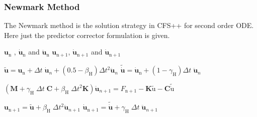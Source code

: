 \subsubsection{Newmark Method}
The Newmark method is the solution strategy in CFS++ for second order ODE. Here just the predictor
corrector formulation is given.
\begin{algorithm}
\caption{General Newmark Effective Mass Formulation} \label{alg:NewmarkEFFMASS}
\begin{algorithmic}
\REQUIRE $\mathbf{u}_{\mathrm{n}}$ , $\mathbf{\dot{u}}_{\mathrm{n}}$ and $\mathbf{\ddot{u}}_{\mathrm{n}}$
\ENSURE $\mathbf{u}_{\mathrm{n}+1}$, $\mathbf{\dot{u}}_{\mathrm{n}+1}$ and $\mathbf{\dot{u}}_{\mathrm{n}+1}$

\STATE {}
\STATE $\tilde{\mathbf{u}} = \mathbf{u}_{\mathrm{n}} + \Delta t\;\mathbf{\dot{u}}_{n}+ (0.5-\beta_{\mathrm{H}}) \Delta
t^2 \mathbf{\ddot{u}}_{n}$
\STATE $\mathbf{\tilde{\dot{u}}} = \mathbf{\dot{u}}_{\mathrm{n}} + (1-\gamma_\mathrm{H}) \Delta t \; \mathbf{\ddot{u}}_{n}$

\STATE {}
\STATE $\left( \mathbf{M} + \gamma_{\mathrm{H}}\; \Delta t\; \mathbf{C} + \beta_{\mathrm{H}}\; \Delta t^2 \mathbf{K}
\right) \mathbf{\ddot{u}}_{n+1} = F_{\mathrm{n}+1} - \mathbf{K} \tilde{\mathrm{u}} - \mathbf{C} \mathrm{\tilde{\dot{u}}}$ 

\STATE {}
\STATE $\mathbf{u}_{\mathrm{n}+1} = \tilde{\mathbf{u}} + \beta_{\mathrm{H}}\; \Delta t^2 \mathbf{\ddot{u}}_{n+1}$
\STATE $\mathbf{\dot{u}}_{\mathrm{n}+1} = \mathbf{\tilde{\dot{u}}} + \gamma_{\mathrm{H}}\; \Delta t\; \mathbf{\ddot{u}}_{n+1}$
\end{algorithmic}
\end{algorithm}

